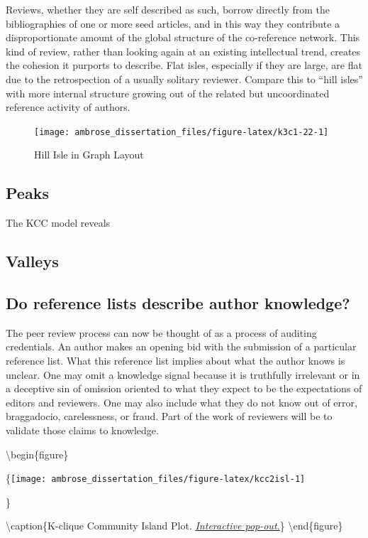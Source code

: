 \documentclass[]{book}
\theoremstyle{definition}
\theoremstyle{definition}
\theoremstyle{definition}
\theoremstyle{remark}
\begin{document}
Reviews, whether they are self described as such, borrow directly from
the bibliographies of one or more seed articles, and in this way they
contribute a disproportionate amount of the global structure of the
co-reference network. This kind of review, rather than looking again at
an existing intellectual trend, creates the cohesion it purports to
describe. Flat isles, especially if they are large, are flat due to the
retrospection of a usually solitary reviewer. Compare this to ``hill
isles'' with more internal structure growing out of the related but
uncoordinated reference activity of authors.

\begin{figure}

{\centering \texttt{[image: ambrose\_dissertation\_files/figure-latex/k3c1-22-1]} 

}

\caption{Hill Isle in Graph Layout}\label{fig:k3c1-22}
\end{figure}

\hypertarget{peaks}{%
\subsection{Peaks}\label{peaks}}

The KCC model reveals

\hypertarget{valleys}{%
\subsection{Valleys}\label{valleys}}

\hypertarget{do-reference-lists-describe-author-knowledge}{%
\subsection{Do reference lists describe author
knowledge?}\label{do-reference-lists-describe-author-knowledge}}

The peer review process can now be thought of as a process of auditing
credentials. An author makes an opening bid with the submission of a
particular reference list. What this reference list implies about what
the author knows is unclear. One may omit a knowledge signal because it
is truthfully irrelevant or in a deceptive sin of omission oriented to
what they expect to be the expectations of editors and reviewers. One
may also include what they do not know out of error, braggadocio,
carelessness, or fraud. Part of the work of reviewers will be to
validate those claims to knowledge.

\textbackslash begin\{figure\}

\{\centering \texttt{[image: ambrose\_dissertation\_files/figure-latex/kcc2isl-1]}

\}

\textbackslash caption\{K-clique Community Island Plot.
\href{exh/isl3d.html}{\emph{Interactive pop-out.}}\}\label{fig:kcc2isl}
\textbackslash end\{figure\}


\end{document}
